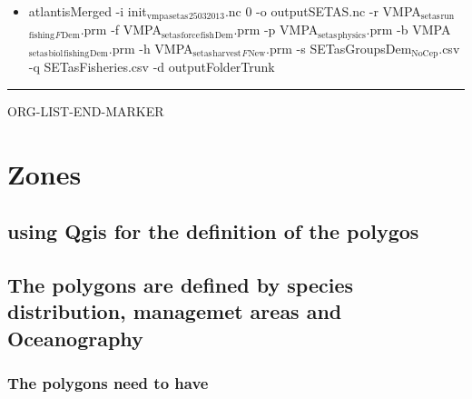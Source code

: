 \documentclass[11pt]{article}
\begin{document}
\begin{itemize}
\item atlantisMerged -i init$_{\mathrm{vmpa}}$$_{\mathrm{setas}}$$_{\mathrm{25032013}}$.nc 0 -o outputSETAS.nc -r VMPA$_{\mathrm{setas}}$$_{\mathrm{run}}$$_{\mathrm{fishing}}$$_F$$_{\mathrm{Dem}}$.prm -f VMPA$_{\mathrm{setas}}$$_{\mathrm{force}}$$_{\mathrm{fish}}$$_{\mathrm{Dem}}$.prm -p VMPA$_{\mathrm{setas}}$$_{\mathrm{physics}}$.prm -b VMPA$_{\mathrm{setas}}$$_{\mathrm{biol}}$$_{\mathrm{fishing}}$$_{\mathrm{Dem}}$.prm -h VMPA$_{\mathrm{setas}}$$_{\mathrm{harvest}}$$_F$$_{\mathrm{New}}$.prm -s SETasGroupsDem$_{\mathrm{NoCep}}$.csv -q SETasFisheries.csv -d outputFolderTrunk
\end{itemize}

\hrule
ORG-LIST-END-MARKER
\section*{Zones}
\label{sec-3}
\subsection*{using Qgis for the definition of the polygos}
\label{sec-3-1}
\subsection*{The polygons are defined by species distribution, managemet areas and Oceanography}
\label{sec-3-2}
\subsubsection*{The polygons need to have}
\label{sec-3-2-1}
\end{document}
